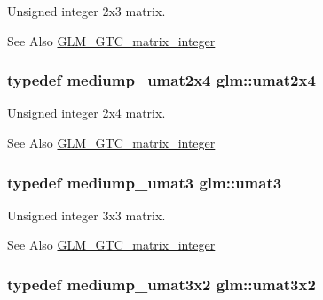 Unsigned integer 2x3 matrix. \begin{DoxySeeAlso}{See Also}
\hyperlink{group__gtc__matrix__integer}{G\-L\-M\-\_\-\-G\-T\-C\-\_\-matrix\-\_\-integer} 
\end{DoxySeeAlso}
\hypertarget{group__gtc__matrix__integer_ga3b23b164240cf4dfb429776da7be9d88}{
\subsubsection[{umat2x4}]{\setlength{\rightskip}{0pt plus 5cm}typedef mediump\-\_\-umat2x4 {\bf glm\-::umat2x4}}}\label{group__gtc__matrix__integer_ga3b23b164240cf4dfb429776da7be9d88}
Unsigned integer 2x4 matrix. \begin{DoxySeeAlso}{See Also}
\hyperlink{group__gtc__matrix__integer}{G\-L\-M\-\_\-\-G\-T\-C\-\_\-matrix\-\_\-integer} 
\end{DoxySeeAlso}
\hypertarget{group__gtc__matrix__integer_ga8b8fbc858e28abf8fc344744f8d6d368}{
\subsubsection[{umat3}]{\setlength{\rightskip}{0pt plus 5cm}typedef mediump\-\_\-umat3 {\bf glm\-::umat3}}}\label{group__gtc__matrix__integer_ga8b8fbc858e28abf8fc344744f8d6d368}
Unsigned integer 3x3 matrix. \begin{DoxySeeAlso}{See Also}
\hyperlink{group__gtc__matrix__integer}{G\-L\-M\-\_\-\-G\-T\-C\-\_\-matrix\-\_\-integer} 
\end{DoxySeeAlso}
\hypertarget{group__gtc__matrix__integer_ga257300f2710612877ef45438a366e308}{
\subsubsection[{umat3x2}]{\setlength{\rightskip}{0pt plus 5cm}typedef mediump\-\_\-umat3x2 {\bf glm\-::umat3x2}}}\label{group__gtc__matrix__integer_ga257300f2710612877ef45438a366e308}
